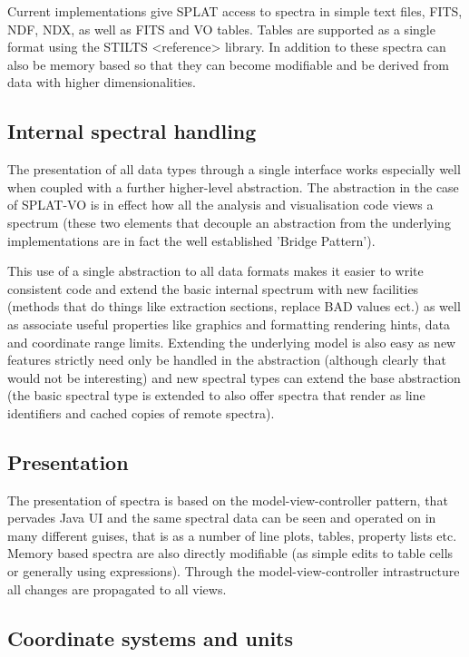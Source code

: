 \documentclass[final,authoryear,5p,times,twocolumn]{elsarticle}
\begin{document}
Current implementations give SPLAT access to spectra in simple text files,
FITS, NDF, NDX, as well as FITS and VO tables. Tables are supported as a
single format using the STILTS <reference> library. In addition to these
spectra can also be memory based so that they can become modifiable and be
derived from data with higher dimensionalities.

\subsection{Internal spectral handling}

The presentation of all data types through a single interface works especially
well when coupled with a further higher-level abstraction. The abstraction in
the case of SPLAT-VO is in effect how all the analysis and visualisation code
views a spectrum (these two elements that decouple an abstraction from the
underlying implementations are in fact the well established 'Bridge Pattern').

This use of a single abstraction to all data formats makes it easier to write
consistent code and extend the basic internal spectrum with new facilities
(methods that do things like extraction sections, replace BAD values ect.) as
well as associate useful properties like graphics and formatting rendering
hints, data and coordinate range limits. Extending the underlying model is
also easy as new features strictly need only be handled in the abstraction
(although clearly that would not be interesting) and new spectral types can
extend the base abstraction (the basic spectral type is extended to also offer
spectra that render as line identifiers and cached copies of remote spectra). 


\subsection{Presentation}

The presentation of spectra is based on the model-view-controller pattern,
that pervades Java UI and the same spectral data can be seen and operated on
in many different guises, that is as a number of line plots, tables, property
lists etc. Memory based spectra are also directly modifiable (as simple edits
to table cells or generally using expressions). Through the
model-view-controller intrastructure all changes are propagated to all views.


\subsection{Coordinate systems and units}
\end{document}
